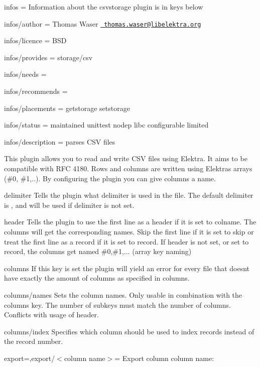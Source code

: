 
\begin{DoxyItemize}
\item infos = Information about the csvstorage plugin is in keys below
\item infos/author = Thomas Waser \href{mailto:thomas.waser@libelektra.org}{\texttt{ thomas.\+waser@libelektra.\+org}}
\item infos/licence = B\+SD
\item infos/provides = storage/csv
\item infos/needs =
\item infos/recommends =
\item infos/placements = getstorage setstorage
\item infos/status = maintained unittest nodep libc configurable limited
\item infos/description = parses C\+SV files
\end{DoxyItemize}

This plugin allows you to read and write C\+SV files using Elektra. It aims to be compatible with R\+FC 4180. Rows and columns are written using Elektra\textquotesingle{}s arrays ({\ttfamily \#0}, {\ttfamily \#1},..). By configuring the plugin you can give columns a name.

{\ttfamily delimiter} Tells the plugin what delimiter is used in the file. The default delimiter is {\ttfamily ,} and will be used if {\ttfamily delimiter} is not set.

{\ttfamily header} Tells the plugin to use the first line as a header if it is set to {\ttfamily colname}. The columns will get the corresponding names. Skip the first line if it is set to {\ttfamily skip} or treat the first line as a record if it is set to {\ttfamily record}. If {\ttfamily header} is not set, or set to {\ttfamily record}, the columns get named \#0,\#1,... (array key naming)

{\ttfamily columns} If this key is set the plugin will yield an error for every file that doesn\textquotesingle{}t have exactly the amount of columns as specified in {\ttfamily columns}.

{\ttfamily columns/names} Sets the column names. Only usable in combination with the {\ttfamily columns} key. The number of subkeys must match the number of columns. Conflicts with usage of {\ttfamily header}.

{\ttfamily columns/index} Specifies which column should be used to index records instead of the record number.

{\ttfamily export=,export/$<$column name$>$=} Export column {\ttfamily column name}\+:


